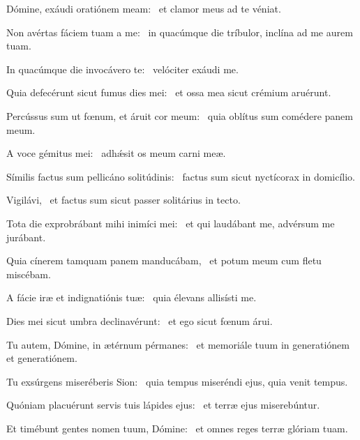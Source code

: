 \item Dómine, exáudi oratiónem meam:~\psstar{} et clamor meus ad te véniat.

\item Non avértas fáciem tuam a me:~\psstar{} in quacúmque die tríbulor, inclína ad me aurem tuam.

\item In quacúmque die invocávero te:~\psstar{} velóciter exáudi me.

\item Quia defecérunt sicut fumus dies mei:~\psstar{} et ossa mea sicut crémium aruérunt.

\item Percússus sum ut fœnum, et áruit cor meum:~\psstar{} quia oblítus sum comédere panem meum.

\item A voce gémitus mei:~\psstar{} adhǽsit os meum carni meæ.

\item Símilis factus sum pellicáno solitúdinis:~\psstar{} factus sum sicut nyctícorax in domicílio.

\item Vigilávi,~\psstar{} et factus sum sicut passer solitárius in tecto.

\item Tota die exprobrábant mihi inimíci mei:~\psstar{} et qui laudábant me, advérsum me jurábant.

\item Quia cínerem tamquam panem manducábam,~\psstar{} et potum meum cum fletu miscébam.

\item A fácie iræ et indignatiónis tuæ:~\psstar{} quia élevans allisísti me.

\item Dies mei sicut umbra declinavérunt:~\psstar{} et ego sicut fœnum árui.

\item Tu autem, Dómine, in ætérnum pérmanes:~\psstar{} et memoriále tuum in generatiónem et generatiónem.

\item Tu exsúrgens miseréberis Sion:~\psstar{} quia tempus miseréndi ejus, quia venit tempus.

\item Quóniam placuérunt servis tuis lápides ejus:~\psstar{} et terræ ejus miserebúntur.

\item Et timébunt gentes nomen tuum, Dómine:~\psstar{} et omnes reges terræ glóriam tuam.

